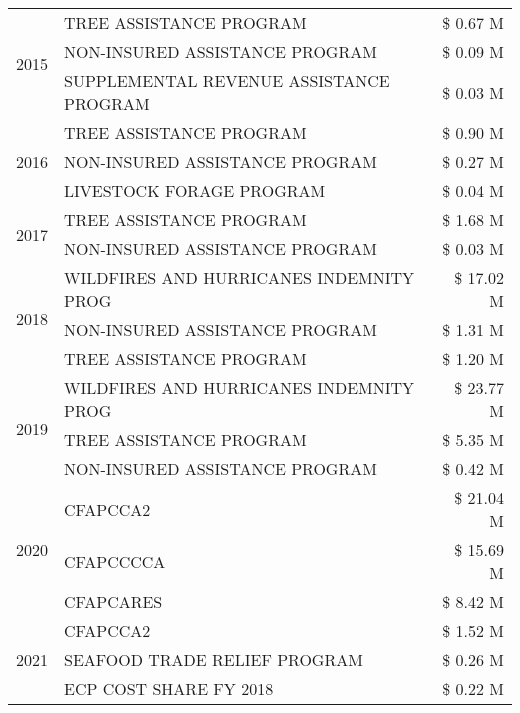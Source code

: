 \begin{tabular}{llr}
\cline{1-3}
\multirow[t]{3}{*}{2015} & TREE ASSISTANCE PROGRAM & \$ 0.67 M \\
 & NON-INSURED ASSISTANCE PROGRAM & \$ 0.09 M \\
 & SUPPLEMENTAL REVENUE ASSISTANCE PROGRAM & \$ 0.03 M \\
\cline{1-3}
\multirow[t]{3}{*}{2016} & TREE ASSISTANCE PROGRAM                       & \$ 0.90 M \\
 & NON-INSURED ASSISTANCE PROGRAM                & \$ 0.27 M \\
 & LIVESTOCK FORAGE PROGRAM                      & \$ 0.04 M \\
\cline{1-3}
\multirow[t]{2}{*}{2017} & TREE ASSISTANCE PROGRAM & \$ 1.68 M \\
 & NON-INSURED ASSISTANCE PROGRAM & \$ 0.03 M \\
\cline{1-3}
\multirow[t]{3}{*}{2018} & WILDFIRES AND HURRICANES INDEMNITY PROG & \$ 17.02 M \\
 & NON-INSURED ASSISTANCE PROGRAM & \$ 1.31 M \\
 & TREE ASSISTANCE PROGRAM & \$ 1.20 M \\
\cline{1-3}
\multirow[t]{3}{*}{2019} & WILDFIRES AND HURRICANES INDEMNITY PROG & \$ 23.77 M \\
 & TREE ASSISTANCE PROGRAM & \$ 5.35 M \\
 & NON-INSURED ASSISTANCE PROGRAM & \$ 0.42 M \\
\cline{1-3}
\multirow[t]{3}{*}{2020} & CFAPCCA2 & \$ 21.04 M \\
 & CFAPCCCCA & \$ 15.69 M \\
 & CFAPCARES & \$ 8.42 M \\
\cline{1-3}
\multirow[t]{3}{*}{2021} & CFAPCCA2 & \$ 1.52 M \\
 & SEAFOOD TRADE RELIEF PROGRAM & \$ 0.26 M \\
 & ECP COST SHARE FY 2018 & \$ 0.22 M \\
\cline{1-3}
\bottomrule
\end{tabular}
